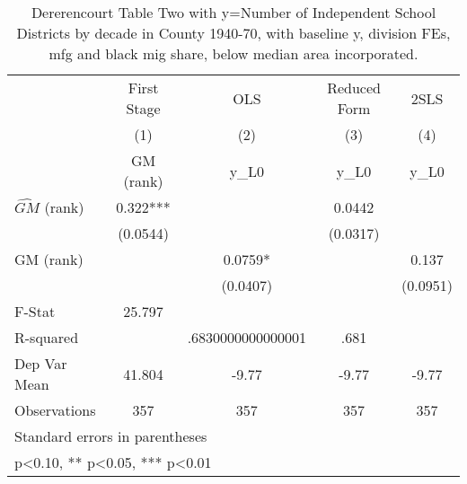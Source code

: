\begin{table}[htbp]\centering
\def\sym#1{\ifmmode^{#1}\else\(^{#1}\)\fi}
\caption{Dererencourt Table Two with y=Number of Independent School Districts by decade in County 1940-70, with baseline y, division FEs, mfg and black mig share, below median area incorporated.}
\begin{tabular}{l*{4}{c}}
\toprule
                    & First Stage   &         OLS   &Reduced Form   &        2SLS   \\
                    &\multicolumn{1}{c}{(1)}&\multicolumn{1}{c}{(2)}&\multicolumn{1}{c}{(3)}&\multicolumn{1}{c}{(4)}\\
                    &\multicolumn{1}{c}{GM  (rank)}&\multicolumn{1}{c}{y\_L0}&\multicolumn{1}{c}{y\_L0}&\multicolumn{1}{c}{y\_L0}\\
\midrule
$\hat{GM}$ (rank)   &       0.322***&               &      0.0442   &               \\
                    &    (0.0544)   &               &    (0.0317)   &               \\
\addlinespace
GM  (rank)          &               &      0.0759*  &               &       0.137   \\
                    &               &    (0.0407)   &               &    (0.0951)   \\
\midrule
F-Stat              &      25.797   &               &               &               \\
R-squared           &               &.6830000000000001   &        .681   &               \\
Dep Var Mean        &      41.804   &       -9.77   &       -9.77   &       -9.77   \\
Observations        &         357   &         357   &         357   &         357   \\
\bottomrule
\multicolumn{5}{l}{\footnotesize Standard errors in parentheses}\\
\multicolumn{5}{l}{\footnotesize * p<0.10, ** p<0.05, *** p<0.01}\\
\end{tabular}
\end{table}
